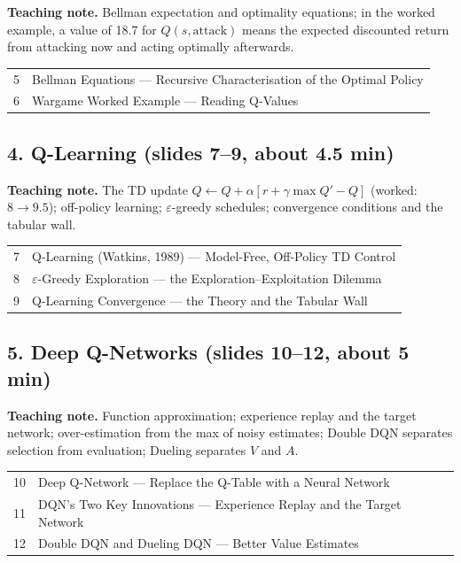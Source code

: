 \documentclass[11pt]{article}
\begin{document}
\textbf{Teaching note.} Bellman expectation and optimality equations; in the worked example, a value of 18.7 for $Q(s,\text{attack})$ means the expected discounted return from attacking now and acting optimally afterwards.

\begin{center}\small\renewcommand{\arraystretch}{1.1}\begin{tabularx}{\textwidth}{@{}r X@{}}5 & Bellman Equations --- Recursive Characterisation of the Optimal Policy\\
6 & Wargame Worked Example --- Reading Q-Values\\\end{tabularx}\end{center}

\subsection{4. Q-Learning \normalfont\small\color{GreyN}(slides 7--9, about 4.5 min)}

\textbf{Teaching note.} The TD update $Q\leftarrow Q+\alpha[r+\gamma\max Q'-Q]$ (worked: $8\to9.5$); off-policy learning; $\varepsilon$-greedy schedules; convergence conditions and the tabular wall.

\begin{center}\small\renewcommand{\arraystretch}{1.1}\begin{tabularx}{\textwidth}{@{}r X@{}}7 & Q-Learning (Watkins, 1989) --- Model-Free, Off-Policy TD Control\\
8 & $\varepsilon$-Greedy Exploration --- the Exploration--Exploitation Dilemma\\
9 & Q-Learning Convergence --- the Theory and the Tabular Wall\\\end{tabularx}\end{center}

\subsection{5. Deep Q-Networks \normalfont\small\color{GreyN}(slides 10--12, about 5 min)}

\textbf{Teaching note.} Function approximation; experience replay and the target network; over-estimation from the max of noisy estimates; Double DQN separates selection from evaluation; Dueling separates $V$ and $A$.

\begin{center}\small\renewcommand{\arraystretch}{1.1}\begin{tabularx}{\textwidth}{@{}r X@{}}10 & Deep Q-Network --- Replace the Q-Table with a Neural Network\\
11 & DQN's Two Key Innovations --- Experience Replay and the Target Network\\
12 & Double DQN and Dueling DQN --- Better Value Estimates\\\end{tabularx}\end{center}
\end{document}
